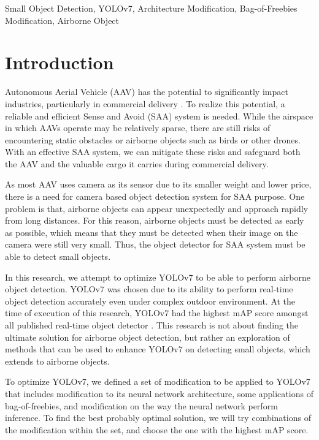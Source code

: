 \documentclass[conference]{IEEEtran}
\begin{document}
\begin{IEEEkeywords}
Small Object Detection, YOLOv7, Architecture Modification, Bag-of-Freebies Modification, Airborne Object
\end{IEEEkeywords}

\section{Introduction}

Autonomous Aerial Vehicle (AAV) has the potential to significantly impact industries, particularly in commercial delivery \cite{prime_air}.
To realize this potential, a reliable and efficient Sense and Avoid (SAA) system is needed.
While the airspace in which AAVs operate may be relatively sparse, there are still risks of encountering static obstacles or airborne objects such as birds or other drones.
With an effective SAA system, we can mitigate these risks and safeguard both the AAV and the valuable cargo it carries during commercial delivery.

As most AAV uses camera as its sensor due to its smaller weight and lower price, 
there is a need for camera based object detection system for SAA purpose.
One problem is that, airborne objects can appear unexpectedly and approach rapidly from
long distances. For this reason, airborne objects must be detected as early as possible, which means
that they must be detected when their image on the camera were still very small. 
Thus, the object detector for SAA system must be able to detect small objects.

In this research, we attempt to optimize YOLOv7 to be able to perform airborne
object detection. YOLOv7 was chosen due to its ability to perform real-time
object detection accurately even under complex outdoor environment. 
At the time of execution of this research, YOLOv7 had the highest mAP score amongst all published real-time object detector \cite{yolov7}.
This research is not about finding the ultimate solution for airborne object detection, but rather an exploration of methods that can be used
to enhance YOLOv7 on detecting small objects, which extends to airborne objects.

To optimize YOLOv7, we defined a set of modification to be applied to YOLOv7
that includes modification to its neural network architecture, some applications
of bag-of-freebies, and modification on the way the neural network perform inference. 
To find the best probably optimal solution, we will try combinations of the modification within the set, and choose the one with the highest mAP score.
\end{document}
